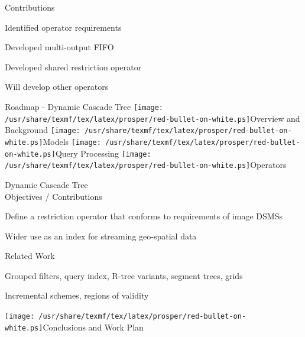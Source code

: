 \documentclass[final,total,bgColor,slideColor,pdf,ps2pdf,default,noaccumulate]{prosper}
\newcommand{\ii}{\texttt{[image: /usr/share/texmf/tex/latex/prosper/red-bullet-on-white.ps]}}
\begin{document}
\begin{slide}{Contributions}
  \begin{Itemize}
  \item Identified operator requirements
  \item Developed multi-output FIFO
  \item Developed shared restriction operator
  \item Will develop other operators
  \end{Itemize}
\end{slide}


\begin{slide}{Roadmap - Dynamic Cascade Tree}
  {\tiny \ii Overview and Background \ii Models \ii Query Processing \ii Operators }
  \begin{Itemize}
  \item Dynamic Cascade Tree \\ {\blue Objectives / Contributions}
      \begin{Itemize}
      \item Define a restriction operator that conforms to
        requirements of image DSMSs
      \item Wider use as an index for streaming geo-spatial data
      \end{Itemize}
      {\blue Related Work}
      \begin{Itemize}
      \item Grouped filters, query index, R-tree variants, segment
        trees, grids
      \item Incremental schemes, regions of validity
      \end{Itemize}
    \end{Itemize}
  {\tiny \ii Conclusions and Work Plan }
\end{slide}
\end{document}
